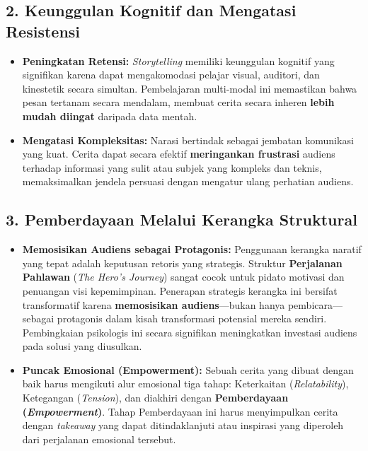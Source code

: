 \documentclass[
  letterpaper,
  DIV=11,
  numbers=noendperiod]{scrreprt}
\providecommand{\tightlist}{%
  \setlength{\itemsep}{0pt}\setlength{\parskip}{0pt}}
\begin{document}
\subsection{2. Keunggulan Kognitif dan Mengatasi
Resistensi}\label{keunggulan-kognitif-dan-mengatasi-resistensi}

\begin{itemize}
\tightlist
\item
  \textbf{Peningkatan Retensi:} \emph{Storytelling} memiliki keunggulan
  kognitif yang signifikan karena dapat mengakomodasi pelajar visual,
  auditori, dan kinestetik secara simultan. Pembelajaran multi-modal ini
  memastikan bahwa pesan tertanam secara mendalam, membuat cerita secara
  inheren \textbf{lebih mudah diingat} daripada data mentah.
\item
  \textbf{Mengatasi Kompleksitas:} Narasi bertindak sebagai jembatan
  komunikasi yang kuat. Cerita dapat secara efektif \textbf{meringankan
  frustrasi} audiens terhadap informasi yang sulit atau subjek yang
  kompleks dan teknis, memaksimalkan jendela persuasi dengan mengatur
  ulang perhatian audiens.
\end{itemize}

\subsection{3. Pemberdayaan Melalui Kerangka
Struktural}\label{pemberdayaan-melalui-kerangka-struktural}

\begin{itemize}
\tightlist
\item
  \textbf{Memosisikan Audiens sebagai Protagonis:} Penggunaan kerangka
  naratif yang tepat adalah keputusan retoris yang strategis. Struktur
  \textbf{Perjalanan Pahlawan} (\emph{The Hero's Journey}) sangat cocok
  untuk pidato motivasi dan penuangan visi kepemimpinan. Penerapan
  strategis kerangka ini bersifat transformatif karena
  \textbf{memosisikan audiens}---bukan hanya pembicara---sebagai
  protagonis dalam kisah transformasi potensial mereka sendiri.
  Pembingkaian psikologis ini secara signifikan meningkatkan investasi
  audiens pada solusi yang diusulkan.
\item
  \textbf{Puncak Emosional (Empowerment):} Sebuah cerita yang dibuat
  dengan baik harus mengikuti alur emosional tiga tahap: Keterkaitan
  (\emph{Relatability}), Ketegangan (\emph{Tension}), dan diakhiri
  dengan \textbf{Pemberdayaan (\emph{Empowerment})}. Tahap Pemberdayaan
  ini harus menyimpulkan cerita dengan \emph{takeaway} yang dapat
  ditindaklanjuti atau inspirasi yang diperoleh dari perjalanan
  emosional tersebut.
\end{itemize}
\end{document}
